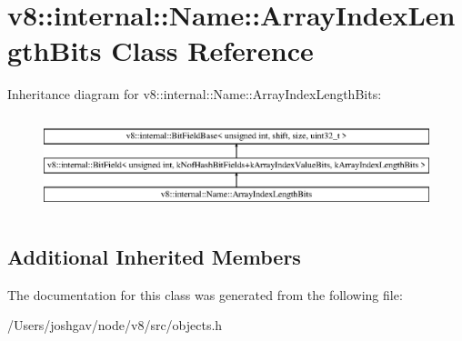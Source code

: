 \hypertarget{classv8_1_1internal_1_1_name_1_1_array_index_length_bits}{}\section{v8\+:\+:internal\+:\+:Name\+:\+:Array\+Index\+Length\+Bits Class Reference}
\label{classv8_1_1internal_1_1_name_1_1_array_index_length_bits}
Inheritance diagram for v8\+:\+:internal\+:\+:Name\+:\+:Array\+Index\+Length\+Bits\+:\begin{figure}[H]
\begin{center}
\leavevmode
\includegraphics[height=2.800000cm]{classv8_1_1internal_1_1_name_1_1_array_index_length_bits}
\end{center}
\end{figure}
\subsection*{Additional Inherited Members}


The documentation for this class was generated from the following file\+:\begin{DoxyCompactItemize}
\item 
/\+Users/joshgav/node/v8/src/objects.\+h\end{DoxyCompactItemize}
